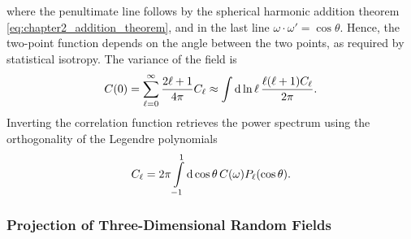 %
where the penultimate line follows by the spherical harmonic addition theorem \cref{eq:chapter2_addition_theorem}, and in the last line \({\omega\cdot\omega' = \cos{\theta}}\).
Hence, the two-point function depends on the angle between the two points, as required by statistical isotropy.
The variance of the field is
%
\begin{equation}
	C(0)
	= \sum\limits_{\ell=0}^{\infty} \frac{2\ell+1}{4\pi} C_{\ell}
	\approx \int\dd{\ln{\ell}} \frac{\ell(\ell+1) C_{\ell}}{2\pi}.
\end{equation}
%
Inverting the correlation function retrieves the power spectrum using the orthogonality of the Legendre polynomials
%
\begin{equation}
	C_{\ell}
	= 2\pi \int\limits_{-1}^{1} \dd{\cos{\theta}} C(\omega) P_{\ell}(\cos{\theta}).
\end{equation}

\subsubsection{Projection of Three-Dimensional Random Fields}

